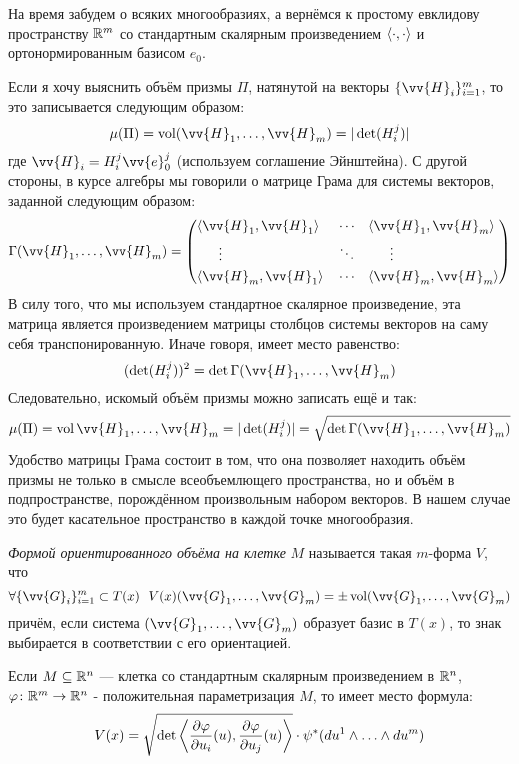 \begin{note}
	На время забудем о всяких многообразиях, а вернёмся к простому евклидову пространству $\mathbb{R}^m$ со стандартным скалярным произведением $\left\langle\cdot, \cdot\right\rangle$ и ортонормированным базисом $e_0$.
	
	Если я хочу выяснить объём призмы $\Pi$, натянутой на векторы $\{\vv{H}_i\}_{i = 1}^m$, то это записывается следующим образом:
	\[
		\mu(\Pi) = \vol(\vv{H}_1, \ldots, \vv{H}_m) = |\det(H_i^j)|
	\]
	где $\vv{H}_i = H_i^j \vv{e}_0^j$ (используем соглашение Эйнштейна). С другой стороны, в курсе алгебры мы говорили о матрице Грама для системы векторов, заданной следующим образом:
	\[
		\Gamma(\vv{H}_1, \ldots, \vv{H}_m) = \Matrix{
			&\ntbr{\vv{H}_1, \vv{H}_1}& &\cdots& &\ntbr{\vv{H}_1, \vv{H}_m}
			\\
			&\quad\;\ \vdots& &\ddots& &\quad\;\ \vdots
			\\
			&\ntbr{\vv{H}_m, \vv{H}_1}& &\cdots& &\ntbr{\vv{H}_m, \vv{H}_m}
		}
	\]
	В силу того, что мы используем стандартное скалярное произведение, эта матрица является произведением матрицы столбцов системы векторов на саму себя транспонированную. Иначе говоря, имеет место равенство:
	\[
		(\det(H_i^j))^2 = \det\Gamma(\vv{H}_1, \ldots, \vv{H}_m)
	\]
	Следовательно, искомый объём призмы можно записать ещё и так:
	\[
		\mu(\Pi) = \vol{\vv{H}_1, \ldots, \vv{H}_m} = |\det(H_i^j)| = \sqrt{\det\Gamma(\vv{H}_1, \ldots, \vv{H}_m)}
	\]
	Удобство матрицы Грама состоит в том, что она позволяет находить объём призмы не только в смысле всеобъемлющего пространства, но и объём в подпространстве, порождённом произвольным набором векторов. В нашем случае это будет касательное пространство в каждой точке многообразия.
\end{note}

\begin{definition}
	\textit{Формой ориентированного объёма на клетке} $M$ называется такая $m$-форма $V$, что
	\[
		\forall \{\vv{G}_i\}_{i = 1}^m \subset T(x)\ \ V(x)(\vv{G}_1, 	\ldots, \vv{G}_m) = \pm \vol(\vv{G}_1, \ldots, \vv{G}_m)
	\]
	причём, если система $(\vv{G}_1, \ldots, \vv{G}_m)$ образует базис в $T(x)$, то знак выбирается в соответствии с его ориентацией.
\end{definition}

\begin{proposition}
	Если $M \subseteq \mathbb{R}^n$ --- клетка со стандартным скалярным произведением в $\mathbb{R}^n$, $\varphi \colon \mathbb{R}^m \to \mathbb{R}^n$ - положительная параметризация $M$, то имеет место формула:
	\[
		V(x) = \sqrt{\det\left\langle\frac{\partial \varphi}{\partial u_i}(u), \frac{\partial \varphi}{\partial u_j}(u)\right\rangle} \cdot \psi^*(du^1 \wedge \ldots \wedge du^m)
	\]
\end{proposition}

